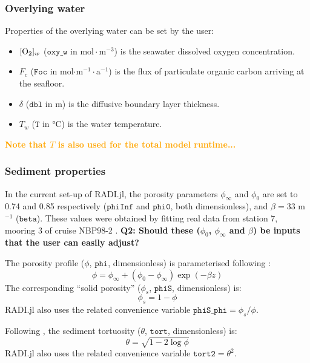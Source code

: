 \documentclass[a4paper]{article}
\newcommand{\code}[1]{\texttt{#1}}
\newcommand{\molmmm}{\mathrm{mol}\cdot\mathrm{m}^{-3}}
\newcommand{\degC}{\si{\degree}\mathrm{C}}
\newcommand{\wtf}[1]{\textcolor{Cerulean}{\textbf{#1}}}
\newcommand{\codenote}[1]{\textcolor{Orange}{\textbf{#1}}}
\begin{document}
\subsubsection{Overlying water}

Properties of the overlying water can be set by the user:

\begin{itemize}
  \item $[\ce{O2}]_w$ ($\code{oxy\_w}$ in $\molmmm$) is the seawater dissolved oxygen concentration.
  \item $F_c$ ($\code{Foc}$ in mol$\cdot$m$^{-1}\cdot$a$^{-1}$) is the flux of particulate organic carbon arriving at the seafloor.
  \item $\delta$ ($\code{dbl}$ in m) is the diffusive boundary layer thickness.
  \item $T_w$ ($\code{T}$ in $\degC$) is the water temperature.
\end{itemize}
\codenote{Note that $T$ is also used for the total model runtime...}

\subsubsection{Sediment properties}

In the current set-up of RADI.jl, the porosity parameters $\phi_\infty$ and $\phi_0$ are set to 0.74 and 0.85 respectively ($\code{phiInf}$ and $\code{phi0}$, both dimensionless), and $\beta = 33$ m$^{-1}$ ($\code{beta}$). These values were obtained by fitting real data from station 7, mooring 3 of cruise NBP98-2 \citep{sayles_benthic_2001}. \wtf{Q2: Should these ($\phi_0$, $\phi_\infty$ and $\beta$) be inputs that the user can easily adjust?}

The porosity profile ($\phi$, $\code{phi}$, dimensionless) is parameterised following \citet{boudreau_method--lines_1996}:
\begin{equation}\label{phi}
\phi = \phi_\infty + (\phi_0 - \phi_\infty) \exp(-\beta z)
\end{equation}
The corresponding ``solid porosity'' ($\phi_s$, $\code{phiS}$, dimensionless) is:
\begin{equation}\label{phiS}
\phi_s = 1 - \phi
\end{equation}
RADI.jl also uses the related convenience variable $\code{phiS\_phi} = \phi_s/\phi$.

Following \citet{boudreau_diffusive_1996}, the sediment tortuosity ($\theta$, $\code{tort}$, dimensionless) is:
\begin{equation}\label{tort}
\theta = \sqrt{1 - 2 \log \phi}
\end{equation}
RADI.jl also uses the related convenience variable $\code{tort2} = \theta^2$.
\end{document}
